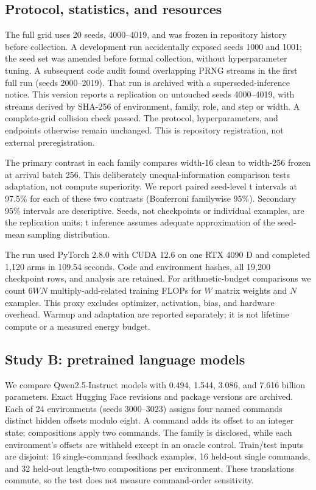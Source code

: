 \documentclass[11pt]{article}
\begin{document}
\subsection{Protocol, statistics, and resources}
The full grid uses 20 seeds, 4000--4019, and was frozen in repository history
before collection. A development run accidentally exposed seeds 1000 and 1001;
the seed set was amended before formal collection, without hyperparameter
tuning. A subsequent code audit found overlapping PRNG streams in the first
full run (seeds 2000--2019). That run is archived with a superseded-inference
notice. This version reports a replication on untouched seeds 4000--4019,
with streams derived by SHA-256 of environment, family, role, and step or
width. A complete-grid collision check passed. The protocol, hyperparameters,
and endpoints otherwise remain unchanged. This is repository registration,
not external preregistration.

The primary contrast in each family compares width-16 clean to width-256
frozen at arrival batch 256. This deliberately unequal-information comparison
tests adaptation, not compute superiority. We report paired seed-level t
intervals at 97.5\% for each of these two contrasts (Bonferroni familywise
95\%). Secondary 95\% intervals are descriptive. Seeds, not checkpoints or
individual examples, are the replication units; t inference assumes adequate
approximation of the seed-mean sampling distribution.

The run used PyTorch 2.8.0 with CUDA 12.6 on one RTX 4090 D and completed
1,120 arms in 109.54 seconds. Code and environment hashes, all 19,200
checkpoint rows, and analysis are retained. For arithmetic-budget comparisons
we count $6WN$ multiply-add-related training FLOPs for $W$ matrix weights
and $N$ examples. This proxy excludes optimizer, activation, bias, and hardware
overhead. Warmup and adaptation are reported separately; it is not lifetime
compute or a measured energy budget.

\subsection{Study B: pretrained language models}
We compare Qwen2.5-Instruct models with 0.494, 1.544, 3.086, and 7.616 billion
parameters. Exact Hugging Face revisions and package versions are archived.
Each of 24 environments (seeds 3000--3023) assigns four named commands distinct
hidden offsets modulo eight. A command adds its offset to an integer state;
compositions apply two commands. The family is disclosed, while each
environment's offsets are withheld except in an oracle control. Train/test
inputs are disjoint: 16 single-command feedback examples, 16 held-out single
commands, and 32 held-out length-two compositions per environment. These
translations commute, so the test does not measure command-order sensitivity.
\end{document}

